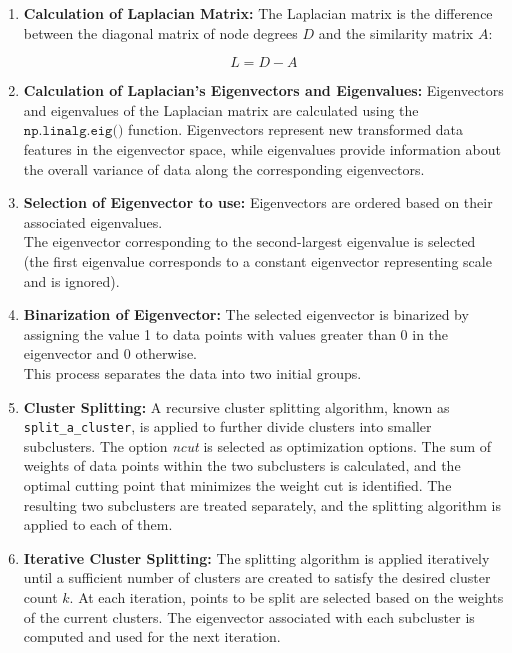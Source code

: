 \begin{enumerate}
    
  \item \textbf{Calculation of Laplacian Matrix:}
  The Laplacian matrix is the difference between the diagonal matrix of node degrees \(D\) and the similarity matrix \(A\): 

  \begin{equation}
    L = D - A
  \end{equation}
  
  \item \textbf{Calculation of Laplacian's Eigenvectors and Eigenvalues:}
  Eigenvectors and eigenvalues of the Laplacian matrix are calculated using the $\texttt{np.linalg.eig()}$ function. Eigenvectors represent new transformed data features in the eigenvector space, while eigenvalues provide information about the overall variance of data along the corresponding eigenvectors.
  
  \item \textbf{Selection of Eigenvector to use:}
  Eigenvectors are ordered based on their associated eigenvalues. \\
  The eigenvector corresponding to the second-largest eigenvalue is selected (the first eigenvalue corresponds to a constant eigenvector representing scale and is ignored).
  
  \item \textbf{Binarization of Eigenvector:}
  The selected eigenvector is binarized by assigning the value 1 to data points with values greater than 0 in the eigenvector and 0 otherwise. \\
  This process separates the data into two initial groups.
  
  \item \textbf{Cluster Splitting:}
  A recursive cluster splitting algorithm, known as \texttt{split\_a\_cluster}, is applied to further divide clusters into smaller subclusters.
  The option \textit{ncut} is selected as optimization options.
  The sum of weights of data points within the two subclusters is calculated, and the optimal cutting point that minimizes the weight cut is identified.
  The resulting two subclusters are treated separately, and the splitting algorithm is applied to each of them.
  
  \item \textbf{Iterative Cluster Splitting:}
  The splitting algorithm is applied iteratively until a sufficient number of clusters are created to satisfy the desired cluster count $k$.
  At each iteration, points to be split are selected based on the weights of the current clusters.
  The eigenvector associated with each subcluster is computed and used for the next iteration.
  

\end{enumerate}
